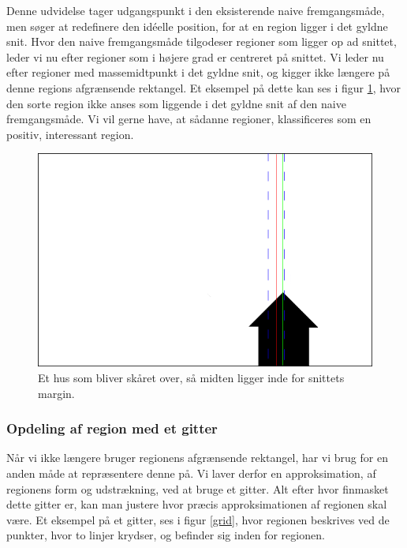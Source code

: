 {
Denne udvidelse tager udgangspunkt i den eksisterende naive
fremgangsmåde, men søger at redefinere den idéelle position, for at en
region ligger i det gyldne snit. Hvor den naive fremgangsmåde tilgodeser
regioner som ligger op ad snittet, leder vi nu efter regioner som i
højere grad er centreret på snittet. Vi leder nu efter regioner med
massemidtpunkt i det gyldne snit, og kigger ikke længere på denne
regions afgrænsende rektangel. Et eksempel på dette kan ses i
figur \ref{hus}, hvor den sorte region ikke anses som liggende i det
gyldne snit af den naive fremgangsmåde. Vi vil gerne have, at sådanne
regioner, klassificeres som en positiv, interessant region.

\begin{figure}[h]
	\begin{center}
		\includegraphics[scale=0.3,angle=0]{afsnit/vores_implementation/billeder/udvidet_loesning/husworks.png}
	\end{center}
	\caption[]{Et hus som bliver skåret over, så midten ligger inde for
    snittets margin.}
	\label{hus}
\end{figure}

\subsubsection{Opdeling af region med et gitter}
Når vi ikke længere bruger regionens afgrænsende rektangel, har vi brug
for en anden måde at repræsentere denne på. Vi laver derfor en
approksimation, af regionens form og udstrækning, ved at bruge et gitter.
Alt efter hvor finmasket dette gitter er, kan man justere hvor præcis
approksimationen af regionen skal være. Et eksempel på et gitter, ses i
figur \ref{grid}, hvor regionen beskrives ved de punkter, hvor to linjer
krydser, og befinder sig inden for regionen.

}
